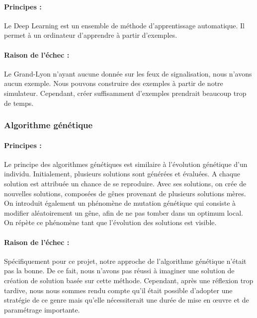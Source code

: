 \documentclass[11pt]{article}
\begin{document}
\paragraph{Principes :}{
Le Deep Learning est un ensemble de méthode d'apprentissage automatique. Il permet à un ordinateur d'apprendre à partir d'exemples.
}
\paragraph{Raison de l'échec :}{
Le Grand-Lyon n'ayant aucune donnée sur les feux de signalisation, nous n'avons aucun exemple. Nous pouvons construire des exemples à partir de notre simulateur. Cependant, créer suffisamment d'exemples prendrait beaucoup trop de temps. 
}

\subsubsection{Algorithme génétique}
\paragraph{Principes :}{
Le principe des algorithmes génétiques est similaire à l'évolution génétique d'un individu. Initialement, plusieurs solutions sont générées et évaluées. A chaque solution est attribuée un chance de se reproduire. Avec ses solutions, on crée de nouvelles solutions, composées de gênes provenant de plusieurs solutions mères. On introduit également un phénomène de mutation génétique qui consiste à modifier aléatoirement un gêne, afin de ne pas tomber dans un optimum local.
On répète ce phénomène tant que l'évolution des solutions est visible. 
}
\paragraph{Raison de l'échec :}{
Spécifiquement pour ce projet, notre approche de l'algorithme génétique n'était pas la bonne. De ce fait, nous n'avons pas réussi à imaginer une solution de création de solution basée sur cette méthode. Cependant, après une réflexion trop tardive, nous nous sommes rendu compte qu'il était possible d'adopter une stratégie de ce genre mais qu'elle nécessiterait une durée de mise en \oe uvre et de paramétrage importante.
}

\end{document}
